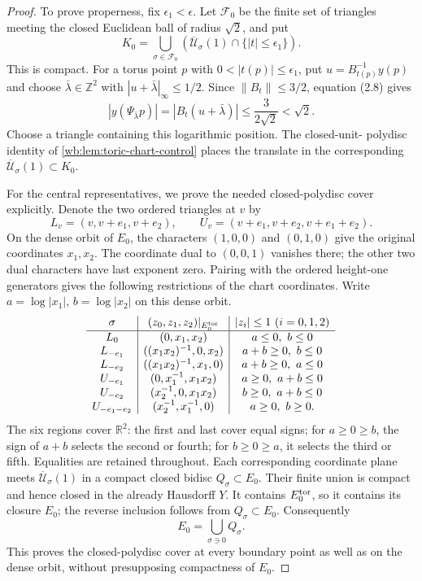 \begin{proof}
To prove properness, fix \(\epsilon_1<\epsilon\).  Let \(\mathcal F_0\) be
the finite set of triangles meeting the closed Euclidean ball of radius
\(\sqrt2\), and put
\[
 K_0=\bigcup_{\sigma\in\mathcal F_0}
 \left(\overline{\mathcal U}_\sigma(1)
 \cap\{|t|\le\epsilon_1\}\right).
\]
This is compact.  For a torus point \(p\) with
\(0<|t(p)|\le\epsilon_1\), put \(u=B_{t(p)}^{-1}y(p)\) and choose
\(\bar\lambda\in\mathbb Z^2\) with
\(|u+\bar\lambda|_\infty\le1/2\).  Since
\(\|B_t\|\le3/2\), equation (2.8) gives
\[
 |y(\Psi_{\bar\lambda}p)|
 =|B_t(u+\bar\lambda)|
 \le\frac{3}{2\sqrt2}<\sqrt2.
\]
Choose a triangle containing this logarithmic position.  The closed-unit-
polydisc identity of \cref{wb:lem:toric-chart-control} places the translate
in the corresponding
\(\overline{\mathcal U}_\sigma(1)\subset K_0\).

For the central representatives, we prove the needed closed-polydisc
cover explicitly.  Denote the two ordered triangles at \(v\) by
\[
 L_v=(v,v+e_1,v+e_2),\qquad
 U_v=(v+e_1,v+e_2,v+e_1+e_2).
\]
On the dense orbit of \(E_0\), the characters \((1,0,0)\) and
\((0,1,0)\) give the original coordinates \(x_1,x_2\).  The coordinate
dual to \((0,0,1)\) vanishes there; the other two dual characters have
last exponent zero.  Pairing with the ordered height-one generators gives
the following restrictions of the chart coordinates.  Write
\(a=\log|x_1|\), \(b=\log|x_2|\) on this dense orbit.
\[
\begin{array}{c|c|c}
 \sigma&(z_0,z_1,z_2)|_{E_0^{\rm tor}}&|z_i|\le1\ (i=0,1,2)\\\hline
 L_0&(0,x_1,x_2)&a\le0,\ b\le0\\
 L_{-e_1}&((x_1x_2)^{-1},0,x_2)&a+b\ge0,\ b\le0\\
 L_{-e_2}&((x_1x_2)^{-1},x_1,0)&a+b\ge0,\ a\le0\\
 U_{-e_1}&(0,x_1^{-1},x_1x_2)&a\ge0,\ a+b\le0\\
 U_{-e_2}&(x_2^{-1},0,x_1x_2)&b\ge0,\ a+b\le0\\
 U_{-e_1-e_2}&(x_2^{-1},x_1^{-1},0)&a\ge0,\ b\ge0.
\end{array}
\]
The six regions cover \(\mathbb R^2\): the first and last cover equal
signs; for \(a\ge0\ge b\), the sign of \(a+b\) selects the second or
fourth; for \(b\ge0\ge a\), it selects the third or fifth.  Equalities
are retained throughout.  Each corresponding coordinate plane meets
\(\overline{\mathcal U}_\sigma(1)\) in a compact closed bidisc
\(Q_\sigma\subset E_0\).  Their finite union is compact and hence closed
in the already Hausdorff \(Y\).  It contains \(E_0^{\rm tor}\), so it
contains its closure \(E_0\); the reverse inclusion follows from
\(Q_\sigma\subset E_0\).  Consequently
\[
 E_0=\bigcup_{\sigma\ni0}Q_\sigma.
\]
This proves the closed-polydisc cover at every boundary point as well as
on the dense orbit, without presupposing compactness of \(E_0\).


\end{proof}
